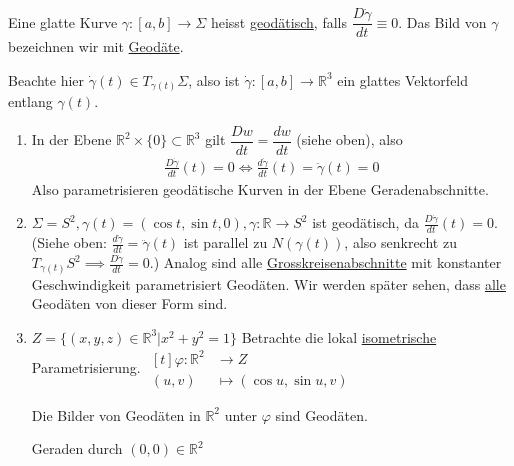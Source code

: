 \documentclass[../main.tex]{subfiles}
\begin{document}
\begin{definition}
Eine glatte Kurve $\gamma : [a,b] \to \Sigma$ heisst \underline{geodätisch}, falls
$\dfrac{D\dot{\gamma}}{dt}\equiv 0 $. Das Bild von $\gamma$ bezeichnen wir mit \underline{Geodäte}.
\end{definition}
Beachte hier $\dot{\gamma}(t) \in T_{\gamma(t)}\Sigma$, also ist $\dot{\gamma}:[a,b] \to \mathbb{R}^3$ ein glattes Vektorfeld entlang $\gamma(t)$.


\begin{examples}
\begin{enumerate}
    \item In der Ebene $\mathbb{R}^2 \times \{0\} \subset \mathbb{R}^3$ gilt $\dfrac{Dw}{dt} = \dfrac{dw}{dt}$ (siehe oben), also 
    \begin{align*}
        \frac{D\dot{\gamma}}{dt}(t)=0 \iff \frac{d\dot{\gamma}}{dt}(t) = \ddot{\gamma}(t) = 0
    \end{align*} Also parametrisieren geodätische Kurven in der Ebene Geradenabschnitte.
    
    \item $\Sigma = S^2, \gamma(t) = (\cos t, \sin t, 0), \gamma : \mathbb{R} \to S^2$ ist geodätisch, da $\frac{D\dot{\gamma}}{dt}(t)=0$. \\
    (Siehe oben: $\frac{d\dot{\gamma}}{dt} = \ddot{\gamma}(t)$ ist parallel zu $N(\gamma(t))$, also senkrecht zu $T_{\gamma(t)}S^2 \implies \frac{D\dot{\gamma}}{dt}=0$.) Analog sind alle \underline{Grosskreisenabschnitte} mit konstanter Geschwindigkeit parametrisiert Geodäten. Wir werden später sehen, dass \underline{alle} Geodäten von dieser Form sind.
    \item $Z = \{(x,y,z) \in \mathbb{R}^3 | x^2 + y^2 = 1\}$
    Betrachte die lokal \underline{isometrische} Parametrisierung.
    $\begin{aligned}[t]
        \varphi : \mathbb{R}^2 & \to Z \\
        (u,v) & \mapsto (\cos u, \sin u, v)
    \end{aligned}$
    \begin{claim}
        Die Bilder von Geodäten in $\mathbb{R}^2$ unter $\varphi$ sind Geodäten.
    \end{claim}
    
    \begin{specialcase}
        Geraden durch $(0,0) \in \mathbb{R}^2$
    \end{specialcase}

\end{enumerate}
\end{examples}
\newpage
\end{document}
